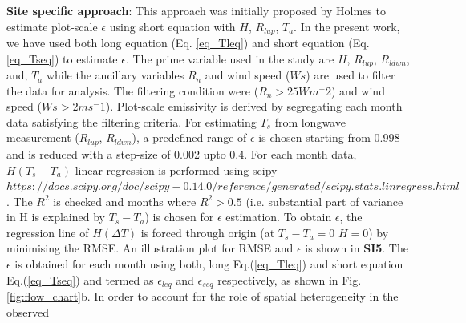 \documentclass[fleqn,10pt]{wlscirep}
\begin{document}
{\textbf{Site specific approach}:
This approach was initially proposed by Holmes\cite{holmes_land_2009-1} to estimate plot-scale $\epsilon$ using short equation with $H$, $R_{lup}$, $T_{a}$. In the present work, we have used both long equation (Eq. \ref{eq_Tleq}) and short equation (Eq. \ref{eq_Tseq}) to estimate $\epsilon$.
The prime variable used in the study are $H$, $R_{lup}$, $R_{ldwn}$, and, $T_{a}$ while the ancillary variables $R_{n}$ and wind speed ($W$$s$) are used to filter the data for analysis. The filtering condition were ($R_{n} > 25 Wm^-2$) and wind speed ($Ws > 2ms^-1$)\cite{holmes_land_2009}. Plot-scale emissivity is derived by segregating each month data satisfying the filtering criteria. For estimating $T_{s}$ from longwave measurement ($R_{lup}$, $R_{ldwn}$), a predefined range of $\epsilon$ is chosen starting from 0.998 and is reduced with a step-size of 0.002 upto 0.4. For each month data, $H (T_{s} - T_{a})$ linear regression is performed using scipy $https://docs.scipy.org/doc/scipy-0.14.0/reference/generated/scipy.stats.linregress.html$. The
$R^2$ is checked and months where $R^{2} > 0.5$ (i.e. substantial part of variance in H is explained by $T_{s} -T_{a}$) is chosen for $\epsilon$ estimation. To obtain $\epsilon$, the regression line of $H (\Delta T)$ is forced through origin (at $T_{s} - T_{a} = 0 $  $H=0$) by minimising the RMSE. An illustration plot for RMSE and $\epsilon$ is shown in \textbf{SI5}. The $\epsilon$ is obtained for each month using both, long Eq.(\ref{eq_Tleq}) and short equation Eq.(\ref{eq_Tseq}) and termed as $\epsilon_{leq}$ and $\epsilon_{seq}$ respectively, as shown in Fig. \ref{fig:flow_chart}b. In order to account for the role of spatial heterogeneity in the observed
$$}
\end{document}
